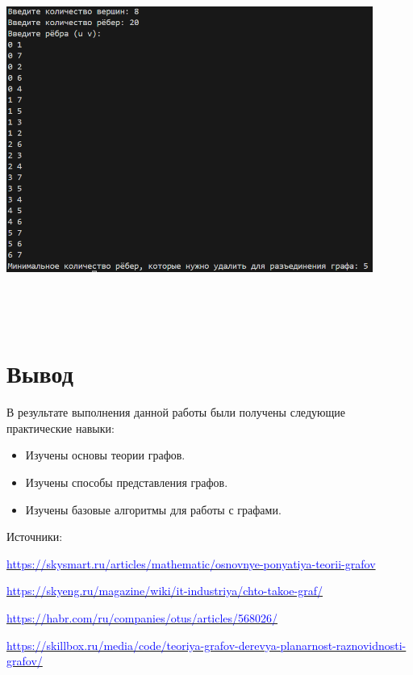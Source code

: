 \documentclass[12pt]{article}
\begin{document}
 \par\includegraphics[width=0.9\textwidth, height=12cm, keepaspectratio]{res5.png}
\section*{Вывод}

В результате выполнения данной работы были получены следующие практические навыки:

\begin{itemize}
    \item Изучены основы теории графов.
    \item Изучены способы представления графов.
    \item Изучены базовые алгоритмы для работы с графами.
\end{itemize}

Источники:
\par 
\href{https://skysmart.ru/articles/mathematic/osnovnye-ponyatiya-teorii-grafov}{\textcolor{blue}{https://skysmart.ru/articles/mathematic/osnovnye-ponyatiya-teorii-grafov}}
\par 
\href{https://skyeng.ru/magazine/wiki/it-industriya/chto-takoe-graf/}{\textcolor{blue}{https://skyeng.ru/magazine/wiki/it-industriya/chto-takoe-graf/}}
\par 
\href{https://habr.com/ru/companies/otus/articles/568026/}{\textcolor{blue}{https://habr.com/ru/companies/otus/articles/568026/}}
\par 
\href{https://skillbox.ru/media/code/teoriya-grafov-derevya-planarnost-raznovidnosti-grafov/}{\textcolor{blue}{https://skillbox.ru/media/code/teoriya-grafov-derevya-planarnost-raznovidnosti-grafov/}}
\end{document}
